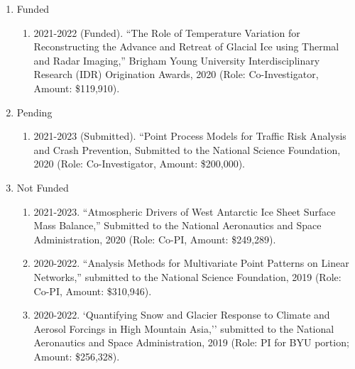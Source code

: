 \documentclass[11pt]{article}
\begin{document}
\begin{enumerate}[label=$\bullet$]
\item Funded
\begin{enumerate}[label=$\cdot$]
\item 2021-2022 (Funded). ``The Role of Temperature Variation for Reconstructing the Advance and Retreat of Glacial Ice using Thermal and Radar Imaging,'' Brigham Young University Interdisciplinary Research (IDR) Origination Awards, 2020 (Role: Co-Investigator, Amount: \$119,910).
\end{enumerate}
\item Pending
\begin{enumerate}[label=$\cdot$]
\item 2021-2023 (Submitted). ``Point Process Models for Traffic Risk Analysis and Crash Prevention, Submitted to the National Science Foundation, 2020 (Role: Co-Investigator, Amount: \$200,000).
\end{enumerate}
\item Not Funded
\begin{enumerate}[label=$\cdot$]
\item 2021-2023. ``Atmospheric Drivers of West Antarctic Ice Sheet Surface Mass Balance,'' Submitted to the National Aeronautics and Space Administration, 2020 (Role: Co-PI, Amount: \$249,289).
\item 2020-2022. ``Analysis Methods for Multivariate Point Patterns on Linear Networks,'' submitted to the National Science Foundation, 2019 (Role: Co-PI, Amount: \$310,946).
\item 2020-2022. `Quantifying Snow and Glacier Response to Climate and Aerosol Forcings in High Mountain Asia,'' submitted to the National Aeronautics and Space Administration, 2019 (Role: PI for BYU portion; Amount: \$256,328).
\end{enumerate}
\end{enumerate}
\end{document}
